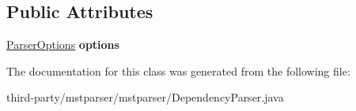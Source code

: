 \subsection*{Public Attributes}
\begin{DoxyCompactItemize}
\item 
\hypertarget{classmstparser_1_1DependencyParser_a8216d15b3935fbd0ec207db1a7e43155}{
\hyperlink{classmstparser_1_1ParserOptions}{ParserOptions} {\bfseries options}}
\label{classmstparser_1_1DependencyParser_a8216d15b3935fbd0ec207db1a7e43155}

\end{DoxyCompactItemize}


The documentation for this class was generated from the following file:\begin{DoxyCompactItemize}
\item 
third-\/party/mstparser/mstparser/DependencyParser.java\end{DoxyCompactItemize}
